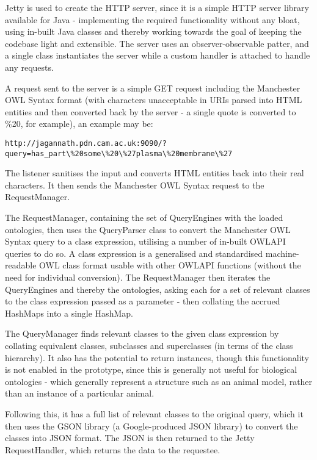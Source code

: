 \documentclass{article}
\begin{document}
Jetty is used to create the HTTP server, since it is a simple HTTP server
library available for Java - implementing the required functionality without any
bloat, using in-built Java classes and thereby working towards the goal of
keeping the codebase light and extensible. The server uses an
observer-observable patter, and a single class instantiates the server while a
custom handler is attached to handle any requests.

A request sent to the server is a simple GET request including the Manchester
OWL Syntax format (with characters unacceptable in URIs parsed into HTML
entities and then converted back by the server - a single quote is converted to
\%20, for example), an example may be:

\begin{lstlisting}
http://jagannath.pdn.cam.ac.uk:9090/?query=has_part\%20some\%20\%27plasma\%20membrane\%27
\end{lstlisting}

The listener sanitises the input and converts HTML entities back into their real
characters. It then sends the Manchester OWL Syntax request to the
RequestManager. 

The RequestManager, containing the set of QueryEngines with the loaded
ontologies, then uses the QueryParser class to convert the Manchester OWL Syntax 
query to a class expression, utilising a number of in-built OWLAPI queries to do
so. A class expression is a generalised and standardised machine-readable OWL
class format usable with other OWLAPI functions (without the need for individual
conversion). The RequestManager then iterates the QueryEngines and thereby the
ontologies, asking each for a set of relevant classes to the class expression
passed as a parameter - then collating the accrued HashMaps into a single
HashMap.

The QueryManager finds relevant classes to the given class expression by
collating equivalent classes, subclasses and superclasses (in terms of the class
hierarchy). It also has the potential to return instances, though this
functionality is not enabled in the prototype, since this is generally not
useful for biological ontologies - which generally represent a structure such as
an animal model, rather than an instance of a particular animal.

Following this, it has a full list of relevant classes to the original query,
which it then uses the GSON library\cite{gson} (a Google-produced JSON library) to convert 
the classes into JSON format. The JSON is then returned to the Jetty
RequestHandler, which returns the data to the requestee.
\end{document}
